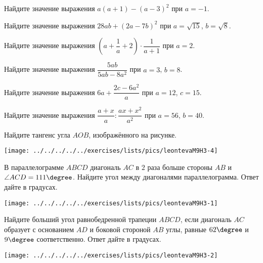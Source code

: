 \begin{homework}[number=3]
	\begin{listofex}
		\item Найдите значение выражения \( a(a+1)-(a-3)^{2} \) при \( a=-1 \).
		\item Найдите значение выражения \( 28ab+(2a-7b)^{2} \) при \( a=\sqrt{15} \), \( b=\sqrt{8} \).
		\item Найдите значение выражения \( \left( a+\dfrac{1}{a}+2 \right)\cdot\dfrac{1}{a+1} \) при \( a=2 \).
		\item Найдите значение выражения \( \dfrac{5ab}{5ab-8a^{2}} \) при \( a=3 \), \( b=8 \).
		\item Найдите значение выражения \( 6a+\dfrac{2c-6a^{2}}{a} \) при \( a=12 \), \( c=15 \).
		\item Найдите значение выражения \( \dfrac{a+x}{a}:\dfrac{ax+x^{2}}{a^{2}} \) при \( a=56 \), \( b=40 \).
		\item 
		\begin{minipage}[t]{\bodywidth}
			Найдите тангенс угла \( AOB \), изображённого на рисунке.
		\end{minipage}
		\hspace{0.02\linewidth}
		\begin{minipage}[t]{\picwidth}
			\texttt{[image: ../../../../../exercises/lists/pics/leontevaM9H3-4]}
		\end{minipage}
		\item 
		\begin{minipage}[t]{\bodywidth}
			В параллелограмме \( ABCD \) диагональ \( AC \) в \( 2 \) раза больше стороны \( AB \) и \( \angle ACD=111 \degree \). Найдите угол между диагоналями параллелограмма. Ответ дайте в градусах.
		\end{minipage}
		\hspace{0.02\linewidth}
		\begin{minipage}[t]{\picwidth}
			\texttt{[image: ../../../../../exercises/lists/pics/leontevaM9H3-1]}
		\end{minipage}
	 	\item 
	 	\begin{minipage}[t]{\bodywidth}
	 		Найдите больший угол равнобедренной трапеции \( ABCD \), если диагональ \( AC \) образует с основанием \( AD \) и боковой стороной \( AB \) углы, равные \( 62\degree \) и \( 9\degree \) соответственно. Ответ дайте в градусах.
	 	\end{minipage}
	 	\hspace{0.02\linewidth}
	 	\begin{minipage}[t]{\picwidth}
			\texttt{[image: ../../../../../exercises/lists/pics/leontevaM9H3-2]}
	 	\end{minipage}
 		

\end{listofex}
\end{homework}
